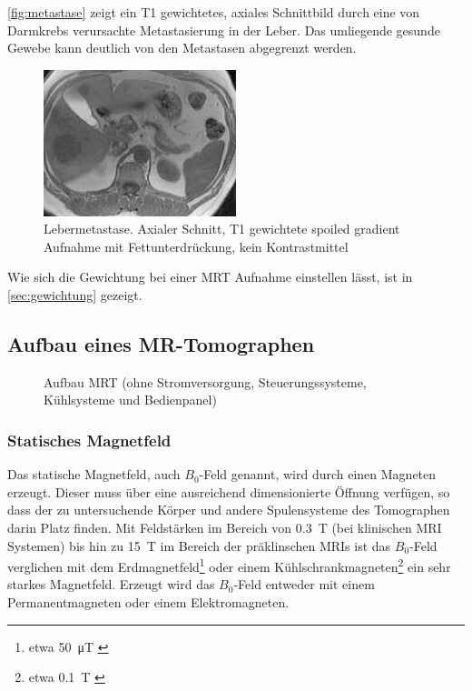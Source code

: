 \autoref{fig:metastase} zeigt ein T1 gewichtetes, axiales Schnittbild durch eine von Darmkrebs verursachte Metastasierung in der Leber. Das umliegende gesunde Gewebe kann deutlich von den Metastasen abgegrenzt werden.

\begin{figure}[H]
	\centering
	\includegraphics[width=0.5\textwidth]{img/metastase.png}
	\caption[Lebermetastase]{Lebermetastase. Axialer Schnitt, T1 gewichtete spoiled gradient Aufnahme mit Fettunterdrückung, kein Kontrastmittel \cite[S.~872]{Reiser2008}}
	\label{fig:metastase}
\end{figure}

Wie sich die Gewichtung bei einer MRT Aufnahme einstellen lässt, ist in \autoref{sec:gewichtung} gezeigt.

\subsection{Aufbau eines MR-Tomographen}

\begin{figure}[H]
	\centering
	\caption[Aufbau MR-Tomographen]{Aufbau MRT (ohne Stromversorgung, Steuerungssysteme, Kühlsysteme und Bedienpanel)}
	\label{fig:biospecAnot}
\end{figure}

\subsubsection{Statisches Magnetfeld}
Das statische Magnetfeld, auch $B_0$-Feld genannt, wird durch einen Magneten erzeugt. Dieser muss über eine ausreichend dimensionierte Öffnung verfügen, so dass der zu untersuchende Körper und andere Spulensysteme des Tomographen darin Platz finden. Mit Feldstärken im Bereich von \SI{0.3}{\tesla} (bei klinischen MRI Systemen) bis hin zu \SI{15}{\tesla} im Bereich der präklinschen MRIs ist das $B_0$-Feld verglichen mit dem Erdmagnetfeld\footnote{etwa \SI{50}{\micro\tesla} \cite{Enc1994}} oder einem Kühlschrankmagneten\footnote{etwa \SI{0.1}{\tesla} \cite{LHC2018}} ein sehr starkes Magnetfeld.
Erzeugt wird das $B_0$-Feld entweder mit einem Permanentmagneten oder einem Elektromagneten. 

